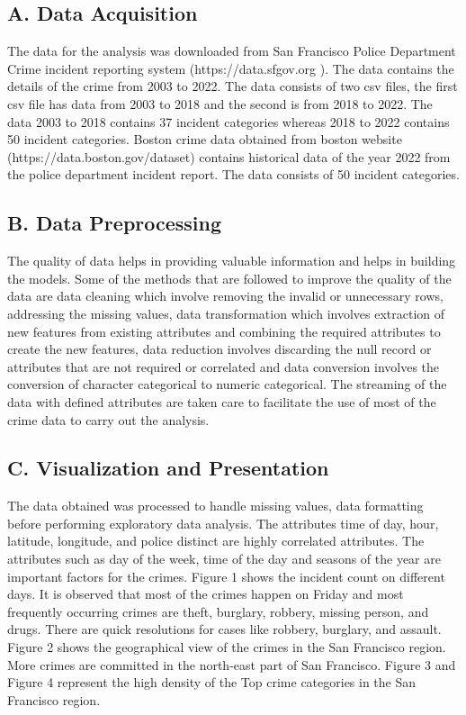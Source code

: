 \documentclass[11 pt,conference,final,]{IEEEtran}
\begin{document}
\subsection{A. Data Acquisition}\label{a.-data-acquisition}

The data for the analysis was downloaded from San Francisco Police
Department Crime incident reporting system (https://data.sfgov.org ).
The data contains the details of the crime from 2003 to 2022. The data
consists of two csv files, the first csv file has data from 2003 to 2018
and the second is from 2018 to 2022. The data 2003 to 2018 contains 37
incident categories whereas 2018 to 2022 contains 50 incident
categories. Boston crime data obtained from boston website
(https://data.boston.gov/dataset) contains historical data of the year
2022 from the police department incident report. The data consists of 50
incident categories.

\subsection{B. Data Preprocessing}\label{b.-data-preprocessing}

The quality of data helps in providing valuable information and helps in
building the models. Some of the methods that are followed to improve
the quality of the data are data cleaning which involve removing the
invalid or unnecessary rows, addressing the missing values, data
transformation which involves extraction of new features from existing
attributes and combining the required attributes to create the new
features, data reduction involves discarding the null record or
attributes that are not required or correlated and data conversion
involves the conversion of character categorical to numeric categorical.
The streaming of the data with defined attributes are taken care to
facilitate the use of most of the crime data to carry out the analysis.

\subsection{C. Visualization and
Presentation}\label{c.-visualization-and-presentation}

The data obtained was processed to handle missing values, data
formatting before performing exploratory data analysis. The attributes
time of day, hour, latitude, longitude, and police distinct are highly
correlated attributes. The attributes such as day of the week, time of
the day and seasons of the year are important factors for the crimes.
Figure 1 shows the incident count on different days. It is observed that
most of the crimes happen on Friday and most frequently occurring crimes
are theft, burglary, robbery, missing person, and drugs. There are quick
resolutions for cases like robbery, burglary, and assault. Figure 2
shows the geographical view of the crimes in the San Francisco region.
More crimes are committed in the north-east part of San Francisco.
Figure 3 and Figure 4 represent the high density of the Top crime
categories in the San Francisco region.
\end{document}
